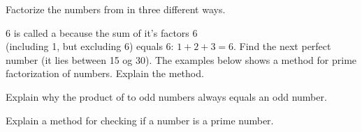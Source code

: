 Factorize the numbers from  in three different ways.

6 is called a  because the sum of it's factors 6 \\(including 1, but excluding 6) equals 6: $ 1+2+3=6 $. Find the next perfect number (it lies between 15 og 30).
\newpage
{}
The examples below shows a method for prime factorization of numbers. Explain the method.
\begin{center}
	\parbox{0.35\linewidth}{
		} \qquad
	\parbox{0.35\linewidth}{
		}
\end{center} 


\newpage
{}
Explain why the product of to odd numbers always equals an odd number.

Explain a method for checking if a number is a prime number.


